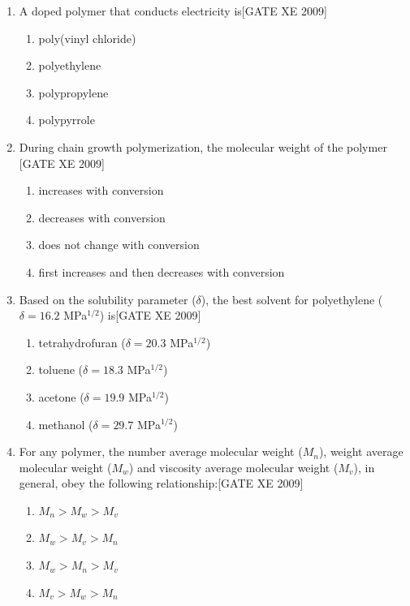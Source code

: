 \documentclass[journal,12pt,onecolumn]{IEEEtran}
\theoremstyle{remark}
\begin{document}
\begin{enumerate}
    \item A doped polymer that conducts electricity is\hfill[GATE XE 2009]
    \begin{multicols}{2}
    \begin{enumerate}
        \item poly(vinyl chloride) 
        \item polyethylene 
        \item polypropylene 
        \item polypyrrole
    \end{enumerate}
    \end{multicols}

   \item During chain growth polymerization, the molecular weight of the polymer
    \hfill[GATE XE 2009]
   \begin{multicols}{2}
    \begin{enumerate}
        \item increases with conversion 
        \item decreases with conversion 
        \item does not change with conversion 
        \item first increases and then decreases with conversion
    \end{enumerate}
    \end{multicols}

   \item  Based on the solubility parameter ($\delta$), the best solvent for polyethylene ($\delta = 16.2$ MPa$^{1/2}$) is\hfill[GATE XE 2009]
   \begin{multicols}{2}
    \begin{enumerate}
        \item tetrahydrofuran ($\delta = 20.3$ MPa$^{1/2}$) 
        \item toluene ($\delta = 18.3$ MPa$^{1/2}$) 
        \item acetone ($\delta = 19.9$ MPa$^{1/2}$)
        \item methanol ($\delta = 29.7$ MPa$^{1/2}$)\
    \end{enumerate}
    \end{multicols}

    \item  For any polymer, the number average molecular weight ($M_n$), weight average molecular weight ($M_w$) and viscosity average molecular weight ($M_v$), in general, obey the following relationship:\hfill[GATE XE 2009]
    \begin{multicols}{2}
    \begin{enumerate}
        \item $M_n > M_w > M_v$ 
        \item $M_w > M_v > M_n$ 
        \item $M_w > M_n > M_v$ 
        \item $M_v > M_w > M_n$
\end{enumerate}
\end{multicols}








\end{enumerate}
\end{document}
